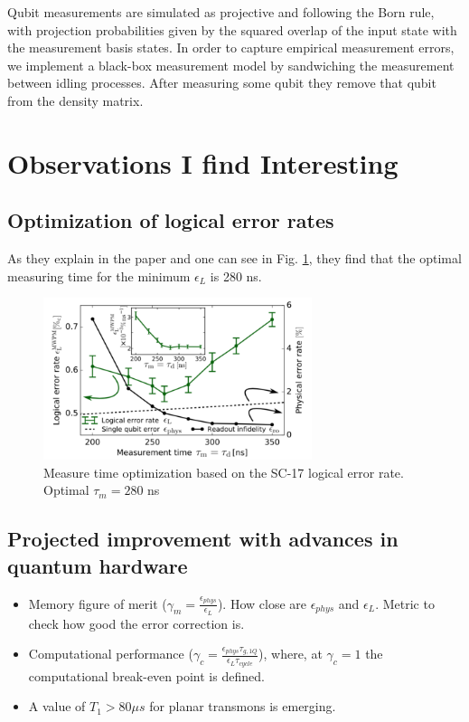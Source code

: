 \documentclass[11pt]{article}
\begin{document}
Qubit measurements are simulated as projective and following the Born rule, with projection probabilities given by the squared overlap of the input state with the measurement basis states. In order to capture empirical measurement errors, we implement a black-box measurement model by sandwiching the measurement between idling processes. After measuring some qubit they remove that qubit from the density matrix.


\section{Observations I find Interesting}
\label{sec:org36c9497}
\subsection{Optimization of logical error rates}
\label{sec:org857c2cf}

As they explain in the paper and one can see in Fig. \ref{fig:orgb9bdeb3}, they find that the optimal measuring time for the minimum \(\epsilon_L\) is 280 ns.

\begin{figure}[htbp]
\centering
\includegraphics[width=0.7\textwidth]{measure_t_optimization.png}
\caption{\label{fig:orgb9bdeb3}
Measure time optimization based on the SC-17 logical error rate. Optimal \(\tau_m = 280\) ns}
\end{figure}


\subsection{Projected improvement with advances in quantum hardware}
\label{sec:org32c7cdc}

\begin{itemize}
\item Memory figure of merit (\(\gamma_m = \frac{\epsilon_{phys}}{\epsilon_{L}}\)). How close are \(\epsilon_{phys}\) and \(\epsilon_{L}\). Metric to check how good the error correction is.

\item Computational performance (\(\gamma_c = \frac{\epsilon_{phys} \tau_{g,1Q}}{\epsilon_L \tau_{cycle}}\)), where, at \(\gamma_c = 1\) the computational break-even point is defined.

\item A value of \(T_1 > 80 \mu s\) for planar transmons is emerging.
\end{itemize}
\end{document}
